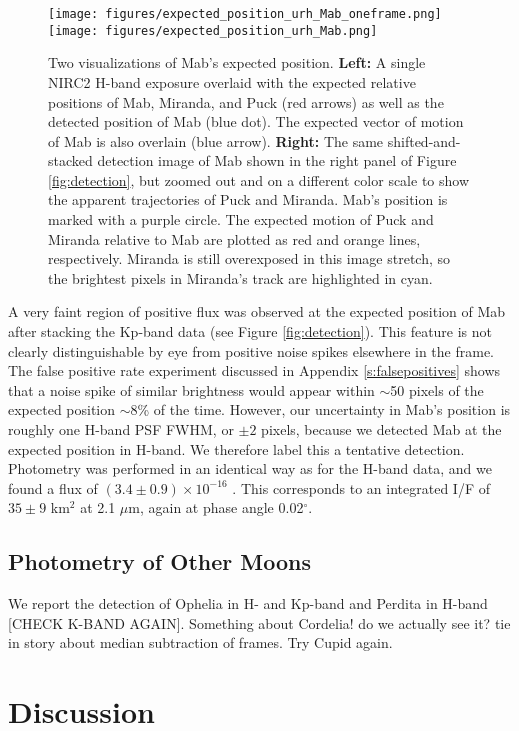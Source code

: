 \documentclass[preprint]{aastex631}
\begin{document}
\begin{figure}
\texttt{[image: figures/expected\_position\_urh\_Mab\_oneframe.png]}
\texttt{[image: figures/expected\_position\_urh\_Mab.png]}
\caption{Two visualizations of Mab's expected position. \textbf{Left:} A single NIRC2 H-band exposure overlaid with the expected relative positions of Mab, Miranda, and Puck (red arrows) as well as the detected position of Mab (blue dot). The expected vector of motion of Mab is also overlain (blue arrow). \textbf{Right:} The same shifted-and-stacked detection image of Mab shown in the right panel of Figure \ref{fig:detection}, but zoomed out and on a different color scale to show the apparent trajectories of Puck and Miranda. Mab's position is marked with a purple circle. The expected motion of Puck and Miranda relative to Mab are plotted as red and orange lines, respectively. Miranda is still overexposed in this image stretch, so the brightest pixels in Miranda's track are highlighted in cyan.\label{fig:astrometry}}
\end{figure}

A very faint region of positive flux was observed at the expected position of Mab after stacking the Kp-band data (see Figure \ref{fig:detection}). This feature is not clearly distinguishable by eye from positive noise spikes elsewhere in the frame. The false positive rate experiment discussed in Appendix \ref{s:falsepositives} shows that a noise spike of similar brightness would appear within $\sim$50 pixels of the expected position $\sim$8\% of the time. However, our uncertainty in Mab's position is roughly one H-band PSF FWHM, or $\pm 2$ pixels, because we detected Mab at the expected position in H-band. We therefore label this a tentative detection. Photometry was performed in an identical way as for the H-band data, and we found a flux of $(3.4 \pm 0.9)\times10^{-16}$ \ergsec{}. This corresponds to an integrated I/F of $35 \pm 9$ km$^{2}$ at 2.1 $\mu$m, again at phase angle 0.02$^\circ$.


\subsection{Photometry of Other Moons}

We report the detection of Ophelia in H- and Kp-band and Perdita in H-band [CHECK K-BAND AGAIN].
Something about Cordelia! do we actually see it?
tie in story about median subtraction of frames.
Try Cupid again.

\section{Discussion}
\label{s:discussion}
\end{document}
